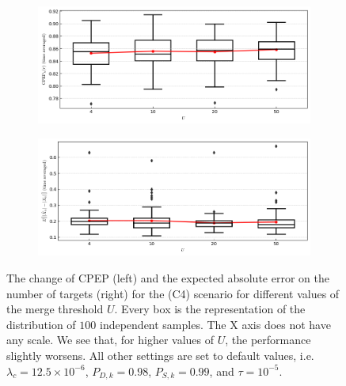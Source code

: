 \begin{figure}
    \centering
    \begin{subfigure}[]{0.48\linewidth}
        \centering
        \includegraphics[width=\linewidth]{figures/c4-u-cpep.png}
    \end{subfigure}
    \hfill
    \begin{subfigure}[]{0.48\linewidth}
        \centering
        \includegraphics[width=\linewidth]{figures/c4-u-eae.png}
    \end{subfigure}
  \caption[(C4). Change of performance depending on the merge threshold.]{The change of CPEP (left) and the expected absolute error on the number of targets (right) for the (C4) scenario for different values of the merge threshold $U$. Every box is the representation of the distribution of $100$ independent samples. The X axis does not have any scale. We see that, for higher values of $U$, the performance slightly worsens. All other settings are set to default values, i.e. $\lambda_{c} = 12.5 \times 10^{-6}$, $P_{D,k} = 0.98$, $P_{S,k} = 0.99$, and $\tau = 10^{-5}$.}
  \label{fig:c4-u}
\end{figure}

